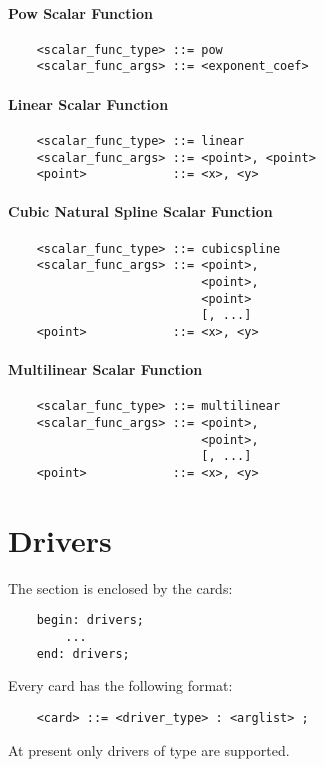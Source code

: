 \subsubsection{Pow Scalar Function}
\begin{verbatim}
    <scalar_func_type> ::= pow
    <scalar_func_args> ::= <exponent_coef>
\end{verbatim}
\subsubsection{Linear Scalar Function}
\begin{verbatim}
    <scalar_func_type> ::= linear
    <scalar_func_args> ::= <point>, <point>
    <point>            ::= <x>, <y>
\end{verbatim}
\subsubsection{Cubic Natural Spline Scalar Function}
\begin{verbatim}
    <scalar_func_type> ::= cubicspline
    <scalar_func_args> ::= <point>, 
                           <point>, 
                           <point>
                           [, ...]
    <point>            ::= <x>, <y>
\end{verbatim}
\subsubsection{Multilinear Scalar Function}
\begin{verbatim}
    <scalar_func_type> ::= multilinear
    <scalar_func_args> ::= <point>, 
                           <point>, 
                           [, ...]
    <point>            ::= <x>, <y>
\end{verbatim}


\chapter{Drivers}\label{sec:DRIVERS}
The  section is enclosed by the cards:
\begin{verbatim}
    begin: drivers;
        ...
    end: drivers;
\end{verbatim}
Every  card has the following format:
\begin{verbatim}
    <card> ::= <driver_type> : <arglist> ;
\end{verbatim}
At present only  drivers of type  are supported.

